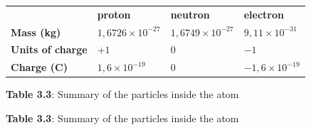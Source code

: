           \begin{table}[H]
        \begin{center}
      \label{m38745*uid14}
    \noindent
      \tablelasttail{}
      \begin{xtabular}[t]{|l|l|l|l|}\hline
         &
                    \textbf{proton}
                   &
                    \textbf{neutron}
                   &
                    \textbf{electron}
     \tabularnewline{}
                    \textbf{Mass (kg)}
                   &
        $1,6726\ensuremath{\times}{10}^{-27}$ &
        $1,6749\ensuremath{\times}{10}^{-27}$ &
        $9,11\ensuremath{\times}{10}^{-31}$%
     \tabularnewline{}
                    \textbf{Units of charge}
                   &
        $+1$ &
        $0$ &
        $-1$%
     \tabularnewline{}
                    \textbf{Charge (C)}
                   &
        $1,6\ensuremath{\times}{10}^{-19}$ &
        $0$ &
        $-1,6\ensuremath{\times}{10}^{-19}$%
     \tabularnewline{}
    \end{xtabular}
      \end{center}
    \begin{center}{\small\bfseries Table 3.3}: Summary of the particles inside the atom\end{center}
    \begin{caption}{\small\bfseries Table 3.3}: Summary of the particles inside the atom\end{caption}
\end{table}
    \par
    \label{m38745*cid5}
